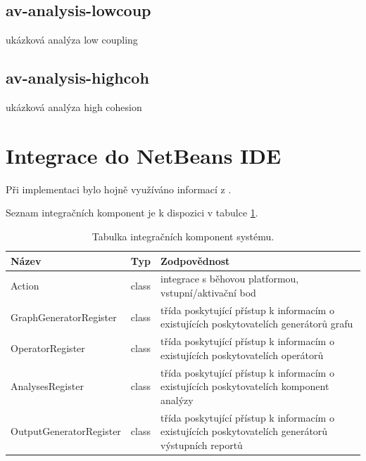 \subsection{av-analysis-lowcoup}
ukázková analýza low coupling

\subsection{av-analysis-highcoh}
ukázková analýza high cohesion

\section{Integrace do NetBeans IDE}

Při implementaci bylo hojně využíváno informací z \cite{netbeans_platform}.

Seznam integračních komponent je k dispozici v tabulce \ref{implementation-integration_components}.

\begin{table}
  \caption{Tabulka integračních komponent systému. \label{implementation-integration_components}}
  \begin{center}
    \begin{tabular}{ | l | l | p{8cm} | }
      \hline
      \textbf{Název} & \textbf{Typ} & \textbf{Zodpovědnost} \\
      \hline
      \hline
      Action & class & integrace s běhovou platformou, vstupní/aktivační bod \\ \hline
      GraphGeneratorRegister & class & třída poskytující přístup k informacím o existujících poskytovatelích generátorů grafu \\ \hline
      OperatorRegister & class & třída poskytující přístup k informacím o existujících poskytovatelích operátorů \\ \hline
      AnalysesRegister & class & třída poskytující přístup k informacím o existujících poskytovatelích komponent analýzy \\ \hline
      OutputGeneratorRegister & class & třída poskytující přístup k informacím o existujících poskytovatelích generátorů výstupních reportů \\ \hline
    \end{tabular}
  \end{center}
\end{table}


